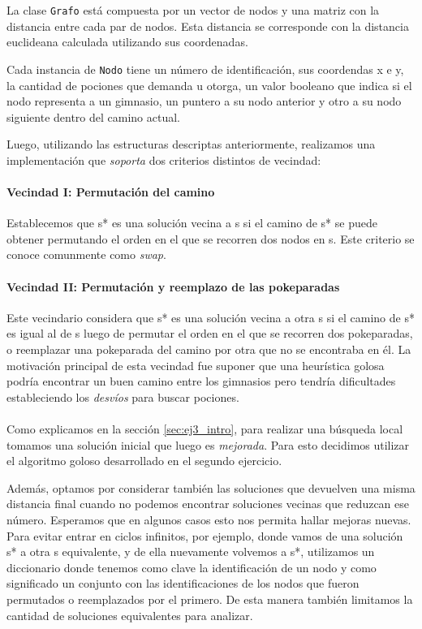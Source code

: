 La clase \texttt{Grafo} est\'a compuesta por un vector de nodos y una matriz con la distancia entre cada par de nodos. Esta distancia se corresponde con la distancia euclideana calculada utilizando sus coordenadas.

Cada instancia de \texttt{Nodo} tiene un n\'umero de identificaci\'on, sus coordendas x e y, la cantidad de pociones que demanda u otorga, un valor booleano que indica si el nodo representa a un gimnasio, un puntero a su nodo anterior y otro a su nodo siguiente dentro del camino actual.

Luego, utilizando las estructuras descriptas anteriormente, realizamos una implementaci\'on que \textit{soporta} dos criterios distintos de vecindad:

\paragraph{Vecindad I: Permutaci\'on del camino}
Establecemos que s* es una soluci\'on vecina a s si el camino de s* se puede obtener permutando el orden en el que se recorren dos nodos en s. Este criterio se conoce comunmente como \textit{swap}.

\paragraph{Vecindad II: Permutaci\'on y reemplazo de las pokeparadas}
Este vecindario considera que s* es una soluci\'on vecina a otra s si el camino de s* es igual al de s luego de permutar el orden en el que se recorren dos pokeparadas, o reemplazar una pokeparada del camino por otra que no se encontraba en \'el. La motivaci\'on principal de esta vecindad fue suponer que una heur\'istica golosa podr\'ia encontrar un buen camino entre los gimnasios pero tendr\'ia dificultades estableciendo los \textit{desv\'ios} para buscar pociones.

\paragraph{}
Como explicamos en la secci\'on \ref{sec:ej3_intro}, para realizar una b\'usqueda local tomamos una soluci\'on inicial que luego es \textit{mejorada}. Para esto decidimos utilizar el algoritmo goloso desarrollado en el segundo ejercicio.

Adem\'as, optamos por considerar tambi\'en las soluciones que devuelven una misma distancia final cuando no podemos encontrar soluciones vecinas que reduzcan ese n\'umero. Esperamos que en algunos casos esto nos permita hallar mejoras nuevas. Para evitar entrar en ciclos infinitos, por ejemplo, donde vamos de una soluci\'on s* a otra s equivalente, y de ella nuevamente volvemos a s*, utilizamos un diccionario donde tenemos como clave la identificaci\'on de un nodo y como significado un conjunto con las identificaciones de los nodos que fueron permutados o reemplazados por el primero. De esta manera tambi\'en limitamos la cantidad de soluciones equivalentes para analizar.


